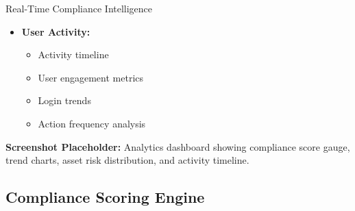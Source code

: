 \documentclass[11pt,a4paper]{article}
\begin{document}
\begin{featurebox}{Real-Time Compliance Intelligence}
\begin{itemize}[itemsep=0.5em]
        \item \textbf{User Activity:}
        \begin{itemize}
            \item Activity timeline
            \item User engagement metrics
            \item Login trends
            \item Action frequency analysis
        \end{itemize}
    \end{itemize}
\end{featurebox}

\vspace{0.5cm}

\textbf{Screenshot Placeholder:} Analytics dashboard showing compliance score gauge, trend charts, asset risk distribution, and activity timeline.

\vspace{1cm}

\subsection{Compliance Scoring Engine}
\end{document}
